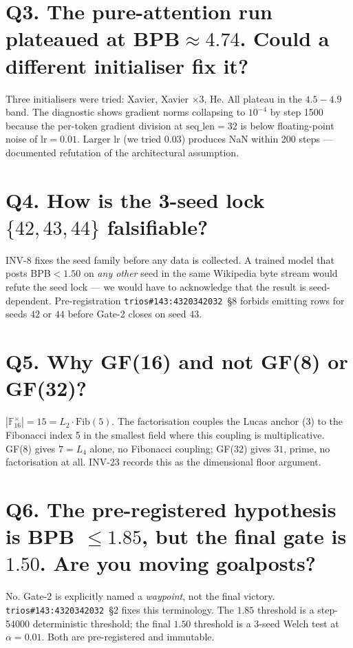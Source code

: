 \section*{Q3. The pure-attention run plateaued at BPB$\approx 4{.}74$. Could a different initialiser fix it?}
Three initialisers were tried: Xavier, Xavier $\times 3$, He. All plateau in
the $4{.}5\!-\!4{.}9$ band. The diagnostic shows gradient norms collapsing to
$10^{-4}$ by step 1500 because the per-token gradient division at
$\mathrm{seq\_len}=32$ is below floating-point noise of $\mathrm{lr}=0{.}01$.
Larger $\mathrm{lr}$ (we tried $0{.}03$) produces NaN within 200 steps —
documented refutation of the architectural assumption.

\section*{Q4. How is the 3-seed lock $\{42,43,44\}$ falsifiable?}
INV-8 fixes the seed family before any data is collected. A trained model that
posts BPB$<\!1{.}50$ on \emph{any other} seed in the same Wikipedia byte stream
would refute the seed lock — we would have to acknowledge that the result is
seed-dependent. Pre-registration \texttt{trios\#143:4320342032}~§8 forbids
emitting rows for seeds $42$ or $44$ before Gate-2 closes on seed $43$.

\section*{Q5. Why GF(16) and not GF(8) or GF(32)?}
$|\mathbb{F}_{16}^{\times}|=15=L_{2}\cdot \mathrm{Fib}(5)$. The factorisation
couples the Lucas anchor (3) to the Fibonacci index 5 in the smallest field
where this coupling is multiplicative. GF(8) gives $7=L_{4}$ alone, no
Fibonacci coupling; GF(32) gives $31$, prime, no factorisation at all. INV-23
records this as the dimensional floor argument.

\section*{Q6. The pre-registered hypothesis is BPB $\leq 1{.}85$, but the final gate is $1{.}50$. Are you moving goalposts?}
No. Gate-2 is explicitly named a \emph{waypoint}, not the final victory.
\texttt{trios\#143:4320342032}~§2 fixes this terminology. The
$1{.}85$ threshold is a step-54000 deterministic threshold; the final $1{.}50$
threshold is a 3-seed Welch test at $\alpha=0{.}01$. Both are pre-registered
and immutable.


